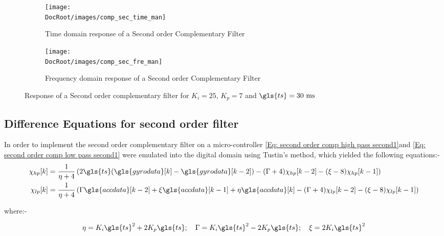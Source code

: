 \begin{figure}[h]
	\centering
	\begin{subfigure}{0.32\textwidth}
		\texttt{[image: \\DocRoot/images/comp\_sec\_time\_man]}
		\caption{Time domain response of a Second order Complementary Filter}
		\label{fg: Time domain comparison responce of the sec order comp filter}
	\end{subfigure}%
	\hspace{3cm}
	\begin{subfigure}{0.32\textwidth}
		\texttt{[image: \\DocRoot/images/comp\_sec\_fre\_man]}
		\caption{Frequency domain response of a Second order Complementary Filter}
		\label{fg: Frequency domain responce of the sec order comp filter}
	\end{subfigure}
	
	\caption{Response of a Second order complementary filter for $K_i = 25$, $K_p = 7$ and ${\gls{ts}} = 30~\mathrm{ms}$ }
	\label{fig sec order comp time and freq responce}
\end{figure}

\newpage
\subsection{Difference Equations for second order filter}
In order to implement the second order complementary filter on a micro-controller \eqref{Eq: second order comp high pass second1}and \eqref{Eq: second order comp low pass second1} were emulated into the digital domain using Tustin's method, which yielded the following equations:-
\begin{align}
	\chi_{hp}[k] & = \frac{1}{\eta + 4}\left(2\gls{ts} ( \gls{gyrodata} [k] - \gls{gyrodata} [k -2] ) - (\Gamma + 4)\chi_{hp}[k-2] - (\xi - 8)\chi_{hp}[k-1] \right) \label{Eq: second order comp high pass second difference eq1}                       \\
	\chi_{lp}[k] & = \frac{1}{\eta +4}\left(\Gamma \gls{accdata} [k-2] + \xi \gls{accdata} [k-1] + \eta \gls{accdata} [k] - (\Gamma + 4)\chi_{lp}[k-2] - (\xi - 8) \chi_{lp}[k - 1] \right) \label{Eq: second order comp low pass second difference eq1}
\end{align}


where:-

\begin{equation*}
	\eta = K_i\gls{ts}^2 + 2K_p\gls{ts};~~~ \Gamma = K_i\gls{ts}^2 - 2 K_p\gls{ts};~~~ \xi = 2K_i\gls{ts}^2
\end{equation*}

